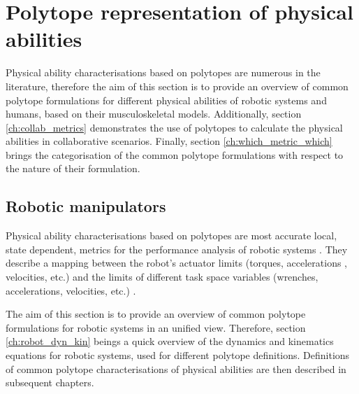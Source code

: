 \section{Polytope representation of physical abilities}
\label{ch:poly_metrics}
Physical ability characterisations based on polytopes are numerous in the literature, therefore the aim of this section is to provide an overview of common polytope formulations for different physical abilities of robotic systems and humans, based on their musculoskeletal models. Additionally, section \ref{ch:collab_metrics} demonstrates the use of polytopes to calculate the physical abilities in collaborative scenarios. Finally, section \ref{ch:which_metric_which} brings the categorisation of the common polytope formulations with respect to the nature of their formulation.

\subsection{Robotic manipulators}
\label{ch:robot_metrics}

Physical ability characterisations based on polytopes are most accurate local, state dependent, metrics for the performance analysis of robotic systems \cite{pholsiri2005real,Finotello1998}. They describe a mapping between the robot's actuator limits (torques, accelerations , velocities, etc.) and the limits of different task space variables (wrenches, accelerations, velocities, etc.) . 

The aim of this section is to provide an overview of common polytope formulations for robotic systems in an unified view.  Therefore, section \ref{ch:robot_dyn_kin} beings a quick overview of the dynamics and kinematics equations for robotic systems, used for different polytope definitions. Definitions 
of common polytope characterisations of physical abilities are then described in subsequent chapters.

